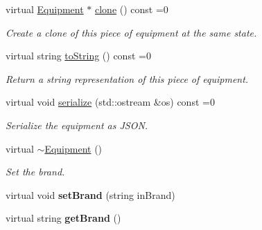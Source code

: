 \begin{DoxyCompactItemize}
\item 
\hypertarget{class_equipment_a5c6929939d117e84e182e21a62a7723a}{}virtual \hyperlink{class_equipment}{Equipment} $\ast$ \hyperlink{class_equipment_a5c6929939d117e84e182e21a62a7723a}{clone} () const  =0\label{class_equipment_a5c6929939d117e84e182e21a62a7723a}

\begin{DoxyCompactList}\small\item\em Create a clone of this piece of equipment at the same state. \end{DoxyCompactList}\item 
\hypertarget{class_equipment_adc1e79be9fcf87bd78e073c5177f89e5}{}virtual string \hyperlink{class_equipment_adc1e79be9fcf87bd78e073c5177f89e5}{to\+String} () const  =0\label{class_equipment_adc1e79be9fcf87bd78e073c5177f89e5}

\begin{DoxyCompactList}\small\item\em Return a string representation of this piece of equipment. \end{DoxyCompactList}\item 
\hypertarget{class_equipment_adc36912d637c7c445db05cab803abeb3}{}virtual void \hyperlink{class_equipment_adc36912d637c7c445db05cab803abeb3}{serialize} (std\+::ostream \&os) const  =0\label{class_equipment_adc36912d637c7c445db05cab803abeb3}

\begin{DoxyCompactList}\small\item\em Serialize the equipment as J\+S\+O\+N. \end{DoxyCompactList}\item 
\hypertarget{class_equipment_a7547b5114f15bb1bdc4ddc1c14da3c8d}{}virtual \hyperlink{class_equipment_a7547b5114f15bb1bdc4ddc1c14da3c8d}{$\sim$\+Equipment} ()\label{class_equipment_a7547b5114f15bb1bdc4ddc1c14da3c8d}

\begin{DoxyCompactList}\small\item\em Set the brand. \end{DoxyCompactList}\item 
\hypertarget{class_equipment_aca4a2e4c4b29ad6d3361d8202e1e1c0c}{}virtual void {\bfseries set\+Brand} (string in\+Brand)\label{class_equipment_aca4a2e4c4b29ad6d3361d8202e1e1c0c}

\item 
\hypertarget{class_equipment_a7138347e7a1f4651f5638ad148c4b7e1}{}virtual string {\bfseries get\+Brand} ()\label{class_equipment_a7138347e7a1f4651f5638ad148c4b7e1}

\end{DoxyCompactItemize}
